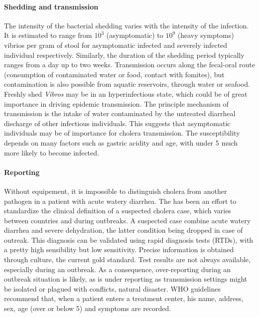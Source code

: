 \paragraph{Shedding and transmission} The intensity of the bacterial shedding varies with the intensity of the infection. It is estimated to range from $10^3$ (asymptomatic) to $10^{9}$ (heavy symptoms) vibrios per gram of stool for asymptomatic infected and severely infected individual respectively\cite{Nelson:CholeraTransmissionHost:2009}. Similarly, the duration of the shedding period typically ranges from a day up to two weeks\cite{Nelson:CholeraTransmissionHost:2009, Kaper:Cholera:1995}.
Transmission occurs along the fecal-oral route (consumption of contaminated water or food, contact with fomites), but contamination is also possible from aquatic reservoirs, through water or seafood. Freshly shed \textit{Vibros} may be in an hyperinfectious state, which could be of great importance in driving epidemic transmission\cite{Butler:CholeraStoolBacteria:2006}. The principle mechanism of transmission is the intake of water contaminated by the untreated diarrheal discharge of other infectious individuals.
This suggests that asymptomatic individuals may be of importance for cholera transmission. The susceptibility depends on many factors such as gastric acidity and age, with under 5 much more likely to become infected\cite{Sack:Cholera:2004}.

\paragraph{Reporting} Without equipement, it is impossible to distinguish cholera from another pathogen in a patient with acute watery diarrhea. The has been an effort to standardize the clinical definition of a suspected cholera case, which varies between countries and during outbreaks. A suspected case combine acute watery diarrhea and severe dehydration, the latter condition being dropped in case of outreak. This diagnosis can be validated using rapid diagnosis tests (RTDs), with a pretty high sensibility but low sensitivity. Precise information is obtained through culture, the current gold standard. Test results are not always available, especially during an outbreak.  As a consequence, over-reporting during an outbreak situation is likely, as is under reporting as transmission settings might be isolated or plagued with conflicts, natural disaster. WHO guidelines recommend that, when a patient enters a treatment center, his name, address, sex, age (over or below 5) and symptoms are recorded\cite{WHO:FirstStepsManaging:2010}. %


